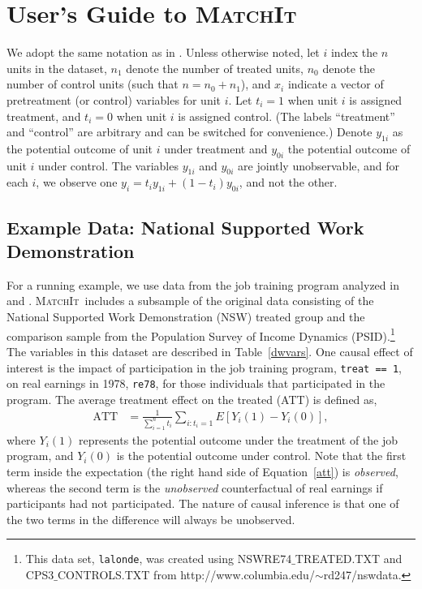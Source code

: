 \documentclass[oneside,letterpaper,titlepage]{article}
\newcommand{\MatchIt}{\textsc{MatchIt}}
\begin{document}
\section{User's Guide to \MatchIt}
\label{methods}

We adopt the same notation as in \citet*{HoImaKin05}. Unless otherwise
noted, let $i$ index the $n$ units in the dataset, $n_1$ denote the
number of treated units, $n_0$ denote the number of control units
(such that $n=n_0+n_1$), and $x_i$ indicate a vector of pretreatment
(or control) variables for unit $i$.  Let $t_i=1$ when unit $i$ is
assigned treatment, and $t_i=0$ when unit $i$ is assigned control.
(The labels ``treatment'' and ``control'' are arbitrary and can be
switched for convenience.)  Denote $y_{1i}$ as the potential outcome
of unit $i$ under treatment and $y_{0i}$ the potential outcome of unit
$i$ under control.  The variables $y_{1i}$ and $y_{0i}$ are jointly
unobservable, and for each $i$, we observe one
$y_i=t_iy_{1i}+(1-t_i)y_{0i}$, and not the other.


\subsection{Example Data: National Supported Work Demonstration}
\label{subsec:lalonde}

For a running example, we use data from the job training program
analyzed in \citet{lalonde86} and \citet{DehWah99}. \MatchIt\ includes
a subsample of the original data consisting of the National Supported
Work Demonstration (NSW) treated group and the comparison sample from
the Population Survey of Income Dynamics (PSID).\footnote{This data
set, \texttt{lalonde}, was created using NSWRE74$\_$TREATED.TXT and
CPS3$\_$CONTROLS.TXT from
http://www.columbia.edu/$\sim$rd247/nswdata.}  The variables in this
dataset are described in Table~\ref{dwvars}.  One causal effect of
interest is the impact of participation in the job training program,
\texttt{treat == 1}, on real earnings in 1978, \texttt{re78}, for
those individuals that participated in the program.  The average
treatment effect on the treated (ATT) is defined as,
\begin{align}
  \label{att}
  \text{ATT} & = \frac{1}{\sum_{i=1}^n t_i}\sum_{i:t_i=1} E[Y_i(1) - Y_i(0)],
\end{align}
where $Y_i(1)$ represents the potential outcome under the treatment of
the job program, and $Y_i(0)$ is the potential outcome under control.
Note that the first term inside the expectation (the right hand side
of Equation~\ref{att}) is \emph{observed}, whereas the second term is
the \emph{unobserved} counterfactual of real earnings if participants
had not participated.  The nature of causal inference is that one of
the two terms in the difference will always be unobserved.
\end{document}
